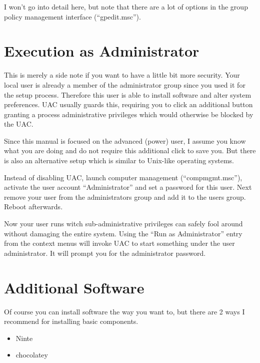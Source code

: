 \documentclass{itsarticle}
\begin{document}
I won't go into detail here, but note that there are a lot of options in the
group policy management interface (``gpedit.msc'').

\section{Execution as Administrator}
\label{sec:execution_as_administrator}

This is merely a side note if you want to have a little bit more security. Your
local user is already a member of the administrator group since you used it for
the setup process. Therefore this user is able to install software and alter
system preferences. UAC usually guards this, requiring you to click an
additional button granting a process administrative privileges which would
otherwise be blocked by the UAC.

Since this manual is focused on the advanced (power) user, I assume you know
what you are doing and do not require this additional click to save you. But
there is also an alternative setup which is similar to Unix-like operating
systems.

Instead of disabling UAC, launch computer management (``compmgmt.msc''),
activate the user account ``Administrator'' and set a password for this user.
Next remove your user from the administrators group and add it to the users
group. Reboot afterwards.

Now your user runs witch sub-administrative privileges can safely fool around
without damaging the entire system. Using the ``Run as Administrator'' entry
from the context menus will invoke UAC to start something under the user
administrator. It will prompt you for the administrator password.

\section{Additional Software}
\label{sec:software}

Of course you can install software the way you want to, but there are 2 ways I
recommend for installing basic components.

\begin{itemize}
    \item Ninte\footnotemark
    \item chocolatey\footnotemark
\end{itemize}

\end{document}
